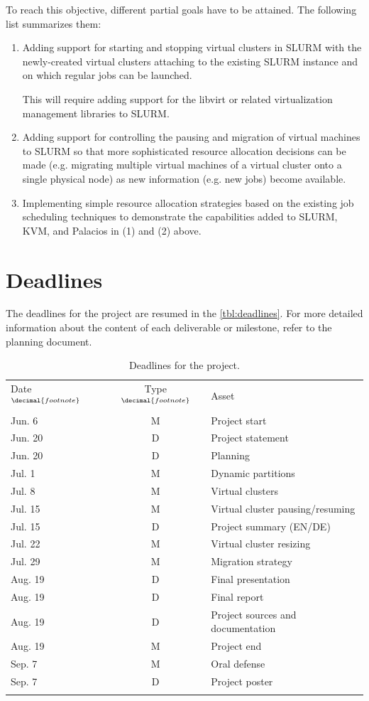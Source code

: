 \documentclass[10pt,authoryear]{sigplanconf} %
\newcommand{\row}{\\\noalign{\smallskip}}
\begin{document}
To reach this objective, different partial goals have to be attained. The following list summarizes them:

\begin{enumerate}
\item Adding support for starting and stopping virtual clusters in SLURM with the newly-created virtual clusters attaching to the existing SLURM instance and on which regular jobs can be launched.

This will require adding support for the libvirt or related virtualization management libraries to SLURM.

\item Adding support for controlling the pausing and migration of virtual machines to SLURM so that more sophisticated resource allocation decisions can be made (e.g. migrating multiple virtual machines of a virtual cluster onto a single physical node) as new information (e.g. new jobs) become available.

\item Implementing simple resource allocation strategies based on the existing job scheduling techniques to demonstrate the capabilities added to SLURM, KVM, and Palacios in (1) and (2) above.
\end{enumerate}


\section{Deadlines}

The deadlines for the project are resumed in the \autoref{tbl:deadlines}. For more detailed information about the content of each deliverable or milestone, refer to the planning document.

\addtocounter{footnote}{1}
\footnotetext[\value{footnote}]{All dates refer to 2011}

\addtocounter{footnote}{1}
\footnotetext[\value{footnote}]{M=Milestone, D=Deliverable}
\addtocounter{footnote}{-1}

\begin{table}[ht]
\begin{tabularx}{\columnwidth}{ l c X }
\toprule\noalign{\smallskip}
Date$^{\decimal{footnote}}$ \addtocounter{footnote}{1}& Type$^{\decimal{footnote}}$ & Asset
\row\hline\hline\noalign{\smallskip}\noalign{\smallskip}
Jun. 6 & M & Project start 
\row
Jun. 20 & D & Project statement
\row
Jun. 20 & D & Planning
\row
Jul. 1 & M & Dynamic partitions
\row
Jul. 8 & M & Virtual clusters
\row
Jul. 15 & M & Virtual cluster pausing/resuming
\row
Jul. 15 & D & Project summary (EN/DE)
\row
Jul. 22 & M & Virtual cluster resizing
\row
Jul. 29 & M & Migration strategy
\row
Aug. 19 & D & Final presentation
\row
Aug. 19 & D & Final report
\row
Aug. 19 & D & Project sources and documentation
\row
Aug. 19 & M & Project end
\row
Sep. 7 & M & Oral defense
\row
Sep. 7 & D & Project poster
\row
\bottomrule
\end{tabularx}

\nocaptionrule\caption{Deadlines for the project.}
\label{tbl:deadlines}

\end{table}
\end{document}
